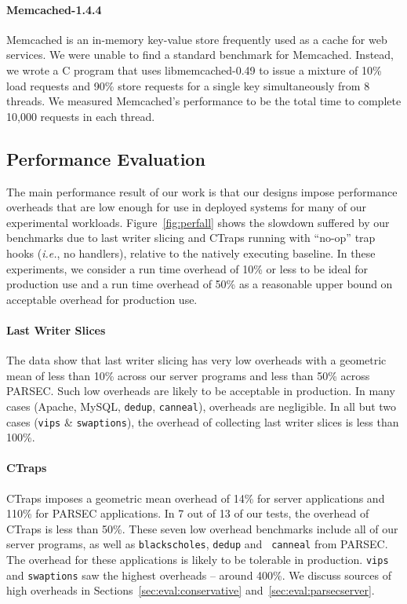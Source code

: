 \documentclass[preprint,9pt]{sigplanconf}
\newcommand{\ctraps}{CTraps\xspace}
\begin{document}
\paragraph{Memcached-1.4.4}
Memcached is an in-memory key-value store frequently used as a cache for web
services.  We were unable to find a standard benchmark for Memcached.  Instead,
we wrote a C program that uses libmemcached-0.49 to issue a
mixture of 10\% load requests and 90\% store requests for a single key 
simultaneously from 8 threads.  We measured Memcached's performance to be the
total time to complete 10,000 requests in each thread.



\subsection{Performance Evaluation}
\label{sec:eval:perf}

The main performance result of our work is that our designs impose performance
overheads that are low enough for use in deployed systems for many of our
experimental workloads.  Figure~\ref{fig:perfall} shows the slowdown suffered
by our benchmarks due to last writer slicing and \ctraps running with ``no-op''
trap hooks ({\em i.e.}, no handlers), relative to the natively executing
baseline.  In these experiments, we consider a run time overhead of 10\% or
less to be ideal for production use and a run time overhead of 50\% as
a reasonable upper bound on acceptable overhead for production use.

\paragraph{Last Writer Slices}
The data show that last writer slicing has very low overheads with a geometric
mean of less than 10\% across our server programs and less than 50\% across
PARSEC.  Such low overheads are likely to be acceptable in production.  In many
cases (Apache, MySQL, {\tt dedup}, {\tt canneal}), overheads are negligible.
In all but two cases ({\tt vips} \& {\tt swaptions}), the overhead of
collecting last writer slices is less than 100\%.    

\paragraph{\ctraps}
\ctraps imposes a geometric mean overhead of 14\% for server applications and
110\% for PARSEC applications.  In 7 out of 13 of our tests, the overhead of
\ctraps is less than 50\%.  These seven low overhead benchmarks include all of
our server programs, as well as {\tt blackscholes}, {\tt dedup} and {\tt
canneal} from PARSEC.  The overhead for these applications is likely to be
tolerable in production.  {\tt vips} and {\tt swaptions} saw the highest
overheads -- around 400\%.  We discuss sources of high overheads in
Sections~\ref{sec:eval:conservative} and~\ref{sec:eval:parsecserver}.
\end{document}
